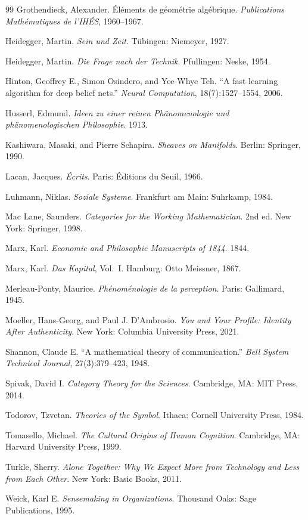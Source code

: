 \documentclass[11pt]{article}
\begin{document}
\begin{thebibliography}{99}
Grothendieck, Alexander.
\'{E}l\'{e}ments de g\'{e}om\'{e}trie alg\'{e}brique.
\textit{Publications Math\'{e}matiques de l'IH\'{E}S}, 1960--1967.

Heidegger, Martin.
\textit{Sein und Zeit}.
T\"{u}bingen: Niemeyer, 1927.

Heidegger, Martin.
\textit{Die Frage nach der Technik}.
Pfullingen: Neske, 1954.

Hinton, Geoffrey E., Simon Osindero, and Yee-Whye Teh.
``A fast learning algorithm for deep belief nets.''
\textit{Neural Computation}, 18(7):1527--1554, 2006.

Husserl, Edmund.
\textit{Ideen zu einer reinen Ph\"{a}nomenologie und ph\"{a}nomenologischen Philosophie}.
1913.

Kashiwara, Masaki, and Pierre Schapira.
\textit{Sheaves on Manifolds}.
Berlin: Springer, 1990.

Lacan, Jacques.
\textit{\'{E}crits}.
Paris: \'{E}ditions du Seuil, 1966.

Luhmann, Niklas.
\textit{Soziale Systeme}.
Frankfurt am Main: Suhrkamp, 1984.

Mac Lane, Saunders.
\textit{Categories for the Working Mathematician}.
2nd ed. New York: Springer, 1998.

Marx, Karl.
\textit{Economic and Philosophic Manuscripts of 1844}.
1844.

Marx, Karl.
\textit{Das Kapital}, Vol.~I.
Hamburg: Otto Meissner, 1867.

Merleau-Ponty, Maurice.
\textit{Ph\'{e}nom\'{e}nologie de la perception}.
Paris: Gallimard, 1945.

Moeller, Hans-Georg, and Paul J. D'Ambrosio.
\textit{You and Your Profile: Identity After Authenticity}.
New York: Columbia University Press, 2021.

Shannon, Claude E.
``A mathematical theory of communication.''
\textit{Bell System Technical Journal}, 27(3):379--423, 1948.

Spivak, David I.
\textit{Category Theory for the Sciences}.
Cambridge, MA: MIT Press, 2014.

Todorov, Tzvetan.
\textit{Theories of the Symbol}.
Ithaca: Cornell University Press, 1984.

Tomasello, Michael.
\textit{The Cultural Origins of Human Cognition}.
Cambridge, MA: Harvard University Press, 1999.

Turkle, Sherry.
\textit{Alone Together: Why We Expect More from Technology and Less from Each Other}.
New York: Basic Books, 2011.

Weick, Karl E.
\textit{Sensemaking in Organizations}.
Thousand Oaks: Sage Publications, 1995.

\end{thebibliography}
\end{document}
